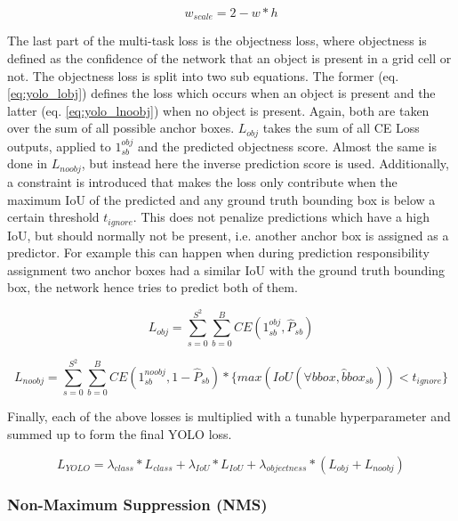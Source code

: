 \begin{equation}
    w_{scale} = 2 - w * h
\end{equation}

The last part of the multi-task loss is the objectness loss, where objectness is defined as the confidence of the network that an object is present in a grid cell or not.
The objectness loss is split into two sub equations.
The former (eq. \ref{eq:yolo_lobj}) defines the loss which occurs when an object is present and the latter (eq. \ref{eq:yolo_lnoobj}) when no object is present.
Again, both are taken over the sum of all possible anchor boxes.
$L_{obj}$ takes the sum of all \ac{CE} Loss outputs, applied to $1_{sb}^{obj}$ and the predicted objectness score.
Almost the same is done in $L_{noobj}$, but instead here the inverse prediction score is used.
Additionally, a constraint is introduced that makes the loss only contribute when the maximum \ac{IoU} of the predicted and any ground truth bounding box is below a certain threshold $t_{ignore}$.
This does not penalize predictions which have a high \ac{IoU}, but should normally not be present, i.e. another anchor box is assigned as a predictor.
For example this can happen when during prediction responsibility assignment two anchor boxes had a similar \ac{IoU} with the ground truth bounding box, the network hence tries to predict both of them.

\begin{equation}
    L_{obj} = \sum_{s=0}^{S^2}\sum_{b=0}^{B} CE(1^{obj}_{sb}, \hat{P}_{sb})
    \label{eq:yolo_lobj}
\end{equation}

\begin{equation}
    L_{noobj} = \sum_{s=0}^{S^2}\sum_{b=0}^{B} CE(1^{noobj}_{sb}, 1 - \hat{P}_{sb}) * \{max(IoU(\forall bbox, \hat{b}box_{sb})) < t_{ignore}\}
    \label{eq:yolo_lnoobj}
\end{equation}


Finally, each of the above losses is multiplied with a tunable hyperparameter and summed up to form the final \ac{YOLO} loss.

\begin{equation}
    L_{YOLO} = \lambda_{class} * L_{class} + \lambda_{IoU} * L_{IoU} + \lambda_{objectness} * (L_{obj} + L_{noobj})
    \label{eq:yolo_loss}
\end{equation}

\subsubsection{Non-Maximum Suppression (NMS)}

